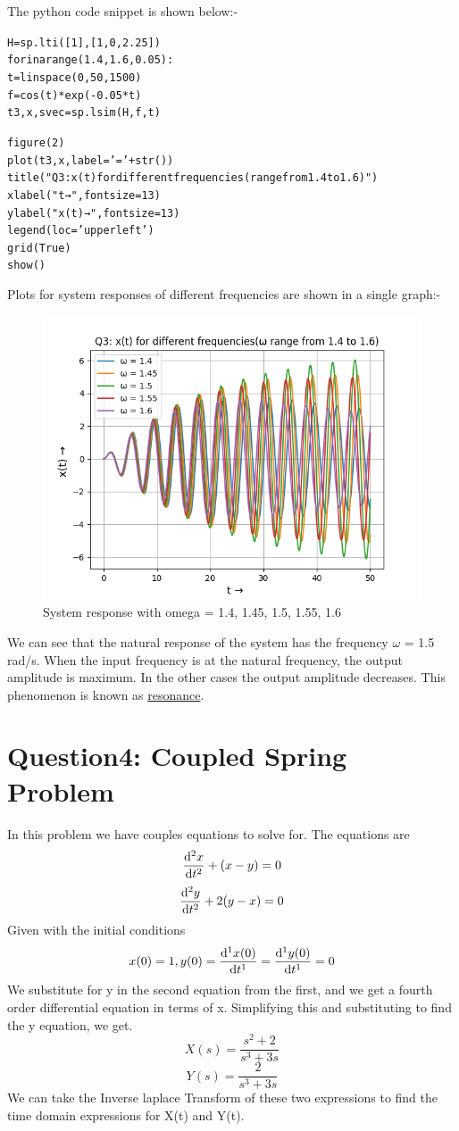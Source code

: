 \documentclass[11pt, a4paper]{article}
\begin{document}
The python code snippet is shown below:-
\begin{alltt}
H = sp.lti([1], [1, 0, 2.25])
for \omega in arange(1.4, 1.6, 0.05):
	t = linspace(0, 50, 1500)
	f = cos(\omega * t) * exp(-0.05 * t)
	t3, x, svec = sp.lsim(H, f, t)


	figure(2)
	plot(t3, x, label = '\omega = ' + str(\omega))
	title("Q3: x(t) for different frequencies(\omega range from 1.4 to 1.6)")
	xlabel("t → ", fontsize = 13)
	ylabel("x(t) → ", fontsize = 13)
	legend(loc = 'upper left')
	grid(True)
show()
\end{alltt}
Plots for system responses of different frequencies are shown in a single graph:-
\begin{figure}[!tbh]
 \centering
 \includegraphics[scale=0.6]{Ass6_Figure_2.png}  
 \caption{System response with omega = 1.4, 1.45, 1.5, 1.55, 1.6}
\end{figure}


\cleardoublepage
We can see that the natural response of the system has the frequency $\omega$ = 1.5 rad/s. When the input frequency is at the natural frequency, the output amplitude is maximum.  In the other cases the output amplitude decreases.  This phenomenon is known as \underline{resonance}. 
\section{Question4: Coupled Spring Problem}

In this problem we have couples equations to solve for.
The equations are
\[\dv[2]{x}{t} +(x-y) = 0 \]
\[\dv[2]{y}{t} +2(y-x) = 0 \]
Given with the initial conditions
\[x(0) = 1, y(0)=\dv[1]{x(0)}{t}=\dv[1]{y(0)}{t}=0\]
We substitute for y in the second equation from the first, and we get a fourth order differential equation in terms of x.
Simplifying this and substituting to find the y equation, we get.
\[X(s) = \frac{s^2+2}{s^3+3s} \]
\[Y(s) =  \frac{2}{s^3+3s} \]
We can take the Inverse laplace Transform of these two expressions to find the time domain expressions for X(t) and Y(t).
\end{document}
